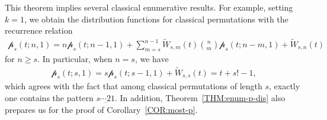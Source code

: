 \documentclass[11pt]{article}
\numberwithin{equation}{section}
\newcommand{\cp}{\mathcal{p}}
\begin{document}
%	

This theorem implies several classical enumerative results. For example, setting $k=1$, we obtain the distribution functions for classical permutations with the recurrence relation
\begin{align}
\cp_s(t;n,1)=%
n\cp_s(t;n-1,1)+\sum_{m=s}^{n-1}\tilde{W}_{s,m}(t)\binom{n}{m}\cp_s(t;n-m,1)+\tilde{W}_{s,n}(t)\label{EQ:pstn1}
\end{align}
for $n\geq s$. In particular, when $n=s$, we have
\begin{align}\label{EQ:psts1}
\cp_s(t;s,1)=s\cp_s(t;s-1,1)+\tilde{W}_{s,s}(t)=t+s!-1,
\end{align}
which agrees with the fact that among classical permutations of length $s$, exactly one contains the pattern $\underline{s\cdots 21}$. In addition, Theorem~\ref{THM:enum-p-dis} also prepares us for the proof of Corollary~\ref{COR:most-p}.
\end{document}
